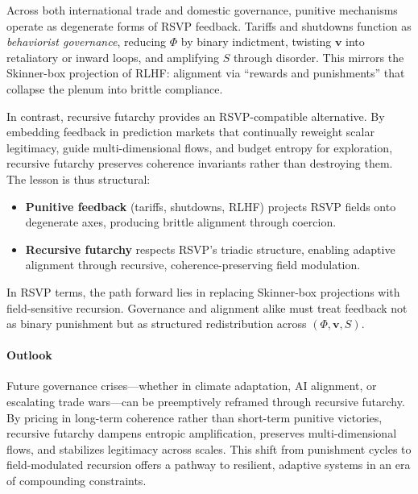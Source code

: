 \documentclass{article}
\begin{document}
Across both international trade and domestic governance, punitive mechanisms 
operate as degenerate forms of RSVP feedback. Tariffs and shutdowns function 
as \emph{behaviorist governance}, reducing $\Phi$ by binary indictment, twisting 
$\mathbf{v}$ into retaliatory or inward loops, and amplifying $S$ through disorder. 
This mirrors the Skinner-box projection of RLHF: alignment via ``rewards and 
punishments'' that collapse the plenum into brittle compliance. 

In contrast, recursive futarchy provides an RSVP-compatible alternative. By 
embedding feedback in prediction markets that continually reweight scalar 
legitimacy, guide multi-dimensional flows, and budget entropy for exploration, 
recursive futarchy preserves coherence invariants rather than destroying them. 
The lesson is thus structural: 

\begin{itemize}
\item \textbf{Punitive feedback} (tariffs, shutdowns, RLHF) projects RSVP fields 
onto degenerate axes, producing brittle alignment through coercion. 
\item \textbf{Recursive futarchy} respects RSVP’s triadic structure, enabling 
adaptive alignment through recursive, coherence-preserving field modulation. 
\end{itemize}

In RSVP terms, the path forward lies in replacing Skinner-box projections with 
field-sensitive recursion. Governance and alignment alike must treat feedback 
not as binary punishment but as structured redistribution across $(\Phi,\mathbf{v},S)$.

\paragraph{Outlook}

Future governance crises—whether in climate adaptation, AI alignment, or escalating trade wars—can be preemptively reframed through recursive futarchy. By pricing in long-term coherence rather than short-term punitive victories, recursive futarchy dampens entropic amplification, preserves multi-dimensional flows, and stabilizes legitimacy across scales. This shift from punishment cycles to field-modulated recursion offers a pathway to resilient, adaptive systems in an era of compounding constraints.
\end{document}
